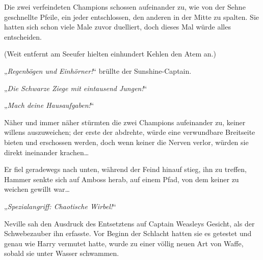Die zwei verfeindeten Champions schossen aufeinander zu, wie von der Sehne geschnellte Pfeile, ein jeder entschlossen, den anderen in der Mitte zu spalten. Sie hatten sich schon viele Male zuvor duelliert, doch dieses Mal würde alles entscheiden.

(Weit entfernt am Seeufer hielten einhundert Kehlen den Atem an.)

„\emph{Regenbögen und Einhörner!}“ brüllte der Sunshine-Captain.

„\emph{Die Schwarze Ziege mit eintausend Jungen!}“

„\emph{Mach deine Hausaufgaben!}“

Näher und immer näher stürmten die zwei Champions aufeinander zu, keiner willens auszuweichen; der erste der abdrehte, würde eine verwundbare Breitseite bieten und erschossen werden, doch wenn keiner die Nerven verlor, würden sie direkt ineinander krachen…

Er fiel geradewegs nach unten, während der Feind hinauf stieg, ihn zu treffen, Hammer senkte sich auf Amboss herab, auf einem Pfad, von dem keiner zu weichen gewillt war…

„\emph{Spezialangriff: Chaotische Wirbel!}“

Neville sah den Ausdruck des Entsetztens auf Captain Weasleys Gesicht, als der Schwebezauber ihn erfasste. Vor Beginn der Schlacht hatten sie es getestet und genau wie Harry vermutet hatte, wurde  zu einer völlig neuen Art von Waffe, sobald sie unter Wasser schwammen.

